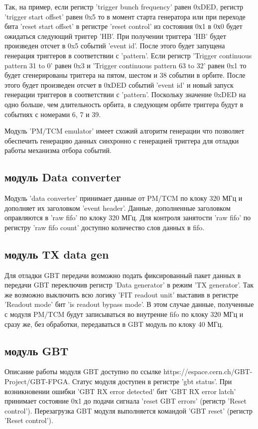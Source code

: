 \documentclass{article}
\begin{document}
Так, на пример, если регистр 'trigger bunch frequency' равен 0xDED, регистр 'trigger start offset' равен 0x5 то в момент старта генератора или при переходе бита 'reset start offset' в регистре 'reset control' из состояния 0х1 в 0х0 будет ожидаться следующий триггер 'HB'. При получении триггера 'HB' будет произведен отсчет в 0x5 событий 'event id'. После этого будет запущена генерация триггеров в соответствии с 'pattern'. Если регистр 'Trigger continuous pattern 31 to 0' равен 0x3 и 'Trigger continuous pattern 63 to 32' равен 0x1 то будет сгенерированы триггера на пятом, шестом и 38 событии в орбите. После этого будет произведен отсчет в 0хDED событий 'event id' и новый запуск генерации триггеров в соответствии с 'pattern'. Поскольку значение 0xDED на одно больше, чем длительность орбита, в следующем орбите триггера будут в событиях с номерами 6, 7 и 39.

Модуль 'PM/TCM emulator' имеет схожий алгоритм генерации что позволяет обеспечить генерацию данных синхронно с генерацией триггера для отладки работы механизма отбора событий.




\subsection{модуль Data converter}
Модуль 'data converter' принимает данные от PM/TCM по клоку 320 МГц и дополняет их заголовком 'event header'. Данные, дополненные заголовком оправляются в 'raw fifo' по клоку 320 МГц. Для контроля занятости 'raw fifo' по регистру 'raw fifo count' доступно количество слов данных в fifo.



\subsection{модуль TX data gen}
Для отладки GBT передачи возможно подать фиксированный пакет данных в передачи GBT переключив регистр 'Data generator' в режим 'TX generator'. Так же возможно выключить всю логику 'FIT readout unit' выставив в регистре 'Readout mode' бит 'is readout bypass mode'. В этом случае данные, полученные с модуля PM/TCM будут записываться во внутренне fifo по клоку 320 МГц и сразу же, без обработки, передаваться в GBT модуль по клоку 40 МГц.


\subsection{модуль GBT}
Описание работы модуля GBT доступно по ссылке https://espace.cern.ch/GBT-Project/GBT-FPGA. Статус модуля доступен в регистре 'gbt status'. При возникновении ошибки 'GBT RX error detected' бит 'GBT RX error latch' принимает состояние 0х1 до подачи сигнала 'reset GBT errors' (регистр 'Reset control'). Перезагрузка GBT модуля выполняется командой 'GBT reset' (регистр 'Reset control').
\end{document}
